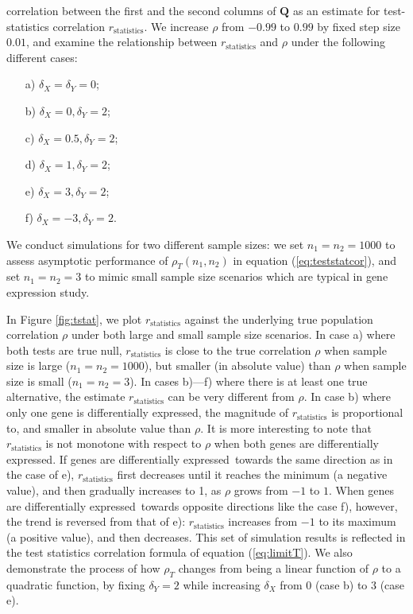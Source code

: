 \documentclass[12pt, a4paper]{article}
\newcommand{\DED}{differentially expressed}
\begin{document}
correlation between the first and the second columns of $\bm Q$ as an estimate for test-statistics 
correlation	$r_\text{statistics}$. 
We increase $\rho$ from $-0.99$ to $0.99$ by fixed step size $0.01$, and examine the 
relationship between $r_\text{statistics}$ and $\rho$ under the following different cases:
\begin{enumerate}
	\item[a)]  $\delta_X = \delta_Y  =0$;
	\item[b)]  $\delta_X = 0, \delta_Y=2$;
	\item[c)]  $\delta_X = 0.5, \delta_Y=2$;
	\item[d)]  $\delta_X = 1, \delta_Y=2$;
	\item[e)]  $\delta_X = 3, \delta_Y=2$;
	\item[f)]  $\delta_X = -3, \delta_Y=2$.
\end{enumerate}

We conduct simulations for two different sample sizes: we set $n_1 = n_2 = 1000$ to assess 
asymptotic performance of $\rho_T(n_1,n_2)$ in equation (\ref{eq:teststatcor}), and set $n_1 = n_2 
= 3$ to mimic small sample size scenarios which are typical in gene expression study. 

In Figure \ref{fig:tstat}, we plot $r_\text{statistics}$ against the 
underlying true population correlation $\rho$ under both large and small sample size scenarios. 
In case a) where both tests are true null, $r_\text{statistics}$ is close to the true 
correlation $\rho$ when sample size is large ($n_1 = n_2 = 1000$), but smaller (in absolute 
value) than $\rho$ when sample size is small ($n_1 = n_2 = 3$).
In cases b)---f) where there is at least one true alternative, the estimate
$r_\text{statistics}$ can be very 
different from $\rho$. In case b) where only one gene is \DED, 
the magnitude of $r_\text{statistics}$ is proportional to, and smaller in absolute value than 
$\rho$.
It is more interesting to note that $r_\text{statistics}$ is not monotone with respect to 
$\rho$ when both genes are \DED. If genes are \DED~towards the same direction as in the case of 
e),  $r_\text{statistics}$ first decreases until it reaches the minimum (a negative value), and 
then gradually increases to 1, as 
$\rho$ grows from $-1$ to $1$. When genes are \DED~towards opposite directions like the case f), 
however, the trend is reversed from that of e): $r_\text{statistics}$ increases from $-1$ to 
its maximum (a positive value), and then decreases. 
This set of simulation results is reflected in the test statistics correlation formula of 
equation (\ref{eq:limitT}). We also demonstrate the process of how $\rho_T$ changes from
being a linear function of $\rho$ to a quadratic function, by fixing $\delta_Y=2$ while 
increasing $\delta_X$ from $0$ (case b) to $3$ (case e).
\end{document}
